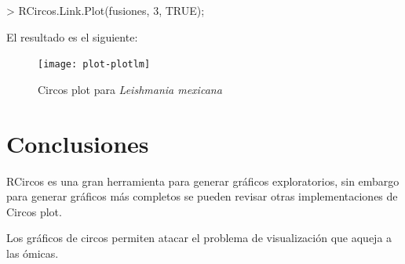 \documentclass[a4paper,spanish]{article}
\begin{document}
\begin{Schunk}
\begin{Sinput}
> RCircos.Link.Plot(fusiones, 3, TRUE);
\end{Sinput}
\end{Schunk}

El resultado es el siguiente:

\begin{figure}[H]
\centering

\texttt{[image: plot-plotlm]}
\caption{Circos plot para \textit{Leishmania mexicana}}
\end{figure}

\section{Conclusiones}
RCircos es una gran herramienta para generar gráficos exploratorios, sin embargo para generar gráficos más completos se pueden revisar otras implementaciones de Circos plot.

Los gráficos de circos permiten atacar el problema de visualización que aqueja a las ómicas.



\nocite{*}
\end{document}
